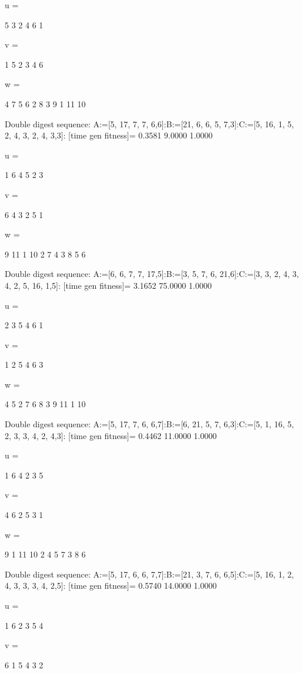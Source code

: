 u =

     5     3     2     4     6     1


v =

     1     5     2     3     4     6


w =

     4     7     5     6     2     8     3     9     1    11    10

Double digest sequence:
A:=[5, 17, 7, 7, 6,6]:B:=[21, 6, 6, 5, 7,3]:C:=[5, 16, 1, 5, 2, 4, 3, 2, 4, 3,3]:
[time gen fitness]=
    0.3581    9.0000    1.0000


u =

     1     6     4     5     2     3


v =

     6     4     3     2     5     1


w =

     9    11     1    10     2     7     4     3     8     5     6

Double digest sequence:
A:=[6, 6, 7, 7, 17,5]:B:=[3, 5, 7, 6, 21,6]:C:=[3, 3, 2, 4, 3, 4, 2, 5, 16, 1,5]:
[time gen fitness]=
    3.1652   75.0000    1.0000


u =

     2     3     5     4     6     1


v =

     1     2     5     4     6     3


w =

     4     5     2     7     6     8     3     9    11     1    10

Double digest sequence:
A:=[5, 17, 7, 6, 6,7]:B:=[6, 21, 5, 7, 6,3]:C:=[5, 1, 16, 5, 2, 3, 3, 4, 2, 4,3]:
[time gen fitness]=
    0.4462   11.0000    1.0000


u =

     1     6     4     2     3     5


v =

     4     6     2     5     3     1


w =

     9     1    11    10     2     4     5     7     3     8     6

Double digest sequence:
A:=[5, 17, 6, 6, 7,7]:B:=[21, 3, 7, 6, 6,5]:C:=[5, 16, 1, 2, 4, 3, 3, 3, 4, 2,5]:
[time gen fitness]=
    0.5740   14.0000    1.0000


u =

     1     6     2     3     5     4


v =

     6     1     5     4     3     2


